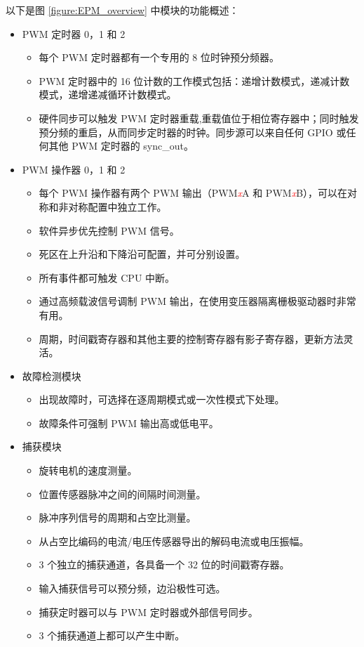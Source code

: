 \documentclass[main\_\_CN.tex]{subfiles}
\begin{document}
以下是图 \ref{figure:EPM_overview} 中模块的功能概述：

\begin{itemize}
    \item PWM 定时器 0，1 和 2
        \begin{itemize}
            \item 每个 PWM 定时器都有一个专用的 8 位时钟预分频器。
            \item
            PWM 定时器中的 16 位计数的工作模式包括：递增计数模式，递减计数模式，递增递减循环计数模式。
            \item 硬件同步可以触发 PWM 定时器重载,重载值位于相位寄存器中；同时触发预分频的重启，从而同步定时器的时钟。同步源可以来自任何 GPIO 或任何其他 PWM 定时器的 sync\_out。
        \end{itemize}
    \item PWM 操作器 0，1 和 2
        \begin{itemize}
            \item 每个 PWM 操作器有两个 PWM 输出（PWM\textcolor{red}{\it{x}}A 和 PWM\textcolor{red}{\it{x}}B），可以在对称和非对称配置中独立工作。
            \item 软件异步优先控制 PWM 信号。
            \item 死区在上升沿和下降沿可配置，并可分别设置。
            \item 所有事件都可触发 CPU 中断。
            \item 通过高频载波信号调制 PWM 输出，在使用变压器隔离栅极驱动器时非常有用。
            \item 周期，时间戳寄存器和其他主要的控制寄存器有影子寄存器，更新方法灵活。
        \end{itemize}
    \item 故障检测模块
        \begin{itemize}
            \item 出现故障时，可选择在逐周期模式或一次性模式下处理。
            \item 故障条件可强制 PWM 输出高或低电平。
        \end{itemize}
    \item 捕获模块
        \begin{itemize}
            \item 旋转电机的速度测量。
            \item 位置传感器脉冲之间的间隔时间测量。
            \item 脉冲序列信号的周期和占空比测量。
            \item 从占空比编码的电流/电压传感器导出的解码电流或电压振幅。
            \item 3 个独立的捕获通道，各具备一个 32 位的时间戳寄存器。
            \item  输入捕获信号可以预分频，边沿极性可选。
            \item 捕获定时器可以与 PWM 定时器或外部信号同步。
            \item 3 个捕获通道上都可以产生中断。
        \end{itemize}
\end{itemize}
\end{document}
